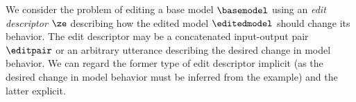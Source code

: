 

We consider the problem of editing a base model $\basemodel$ using an \textit{edit descriptor} $\ze$ describing how the edited model $\editedmodel$ should change its behavior. The edit descriptor may be a concatenated input-output pair $\editpair$  
or an arbitrary utterance 
describing the desired change in model behavior. We can regard the former type of edit descriptor implicit (as the desired change in model behavior must be inferred from the example) and the latter explicit.


